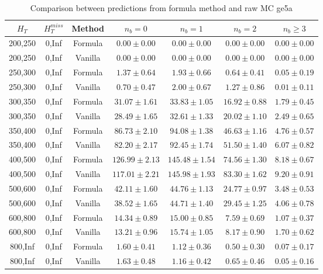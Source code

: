\begin{longtable}{ | c | c | c | c | c | c | c | }
\caption{Comparison between predictions from formula method and raw MC ge5a} \label{tab:formula-ge5a} \\    \hline 
$H_{T}$ & $H_{T}^{miss}$ & Method & $n_{b} = 0$ & $n_{b} = 1$ & $n_{b} = 2$ & $n_{b} \ge 3$ \\ \hline200,250 & 0,Inf & Formula  & $     0.00 \pm  0.00 $ & $     0.00 \pm  0.00 $ & $     0.00 \pm  0.00 $ & $     0.00 \pm  0.00 $  \\  
200,250 & 0,Inf & Vanilla  & $     0.00 \pm  0.00 $ & $     0.00 \pm  0.00 $ & $     0.00 \pm  0.00 $ & $     0.00 \pm  0.00 $  \\ \hline 
250,300 & 0,Inf & Formula  & $     1.37 \pm  0.64 $ & $     1.93 \pm  0.66 $ & $     0.64 \pm  0.41 $ & $     0.05 \pm  0.19 $  \\  
250,300 & 0,Inf & Vanilla  & $     0.70 \pm  0.47 $ & $     2.00 \pm  0.67 $ & $     1.27 \pm  0.86 $ & $     0.01 \pm  0.11 $  \\ \hline 
300,350 & 0,Inf & Formula  & $    31.07 \pm  1.61 $ & $    33.83 \pm  1.05 $ & $    16.92 \pm  0.88 $ & $     1.79 \pm  0.45 $  \\  
300,350 & 0,Inf & Vanilla  & $    28.49 \pm  1.65 $ & $    32.61 \pm  1.33 $ & $    20.02 \pm  1.10 $ & $     2.49 \pm  0.65 $  \\ \hline 
350,400 & 0,Inf & Formula  & $    86.73 \pm  2.10 $ & $    94.08 \pm  1.38 $ & $    46.63 \pm  1.16 $ & $     4.76 \pm  0.57 $  \\  
350,400 & 0,Inf & Vanilla  & $    82.20 \pm  2.17 $ & $    92.45 \pm  1.74 $ & $    51.50 \pm  1.40 $ & $     6.07 \pm  0.82 $  \\ \hline 
400,500 & 0,Inf & Formula  & $   126.99 \pm  2.13 $ & $   145.48 \pm  1.54 $ & $    74.56 \pm  1.30 $ & $     8.18 \pm  0.67 $  \\  
400,500 & 0,Inf & Vanilla  & $   117.01 \pm  2.21 $ & $   145.98 \pm  1.93 $ & $    83.30 \pm  1.62 $ & $     9.20 \pm  0.91 $  \\ \hline 
500,600 & 0,Inf & Formula  & $    42.11 \pm  1.60 $ & $    44.76 \pm  1.13 $ & $    24.77 \pm  0.97 $ & $     3.48 \pm  0.53 $  \\  
500,600 & 0,Inf & Vanilla  & $    38.52 \pm  1.65 $ & $    44.71 \pm  1.40 $ & $    29.45 \pm  1.25 $ & $     4.06 \pm  0.78 $  \\ \hline 
600,800 & 0,Inf & Formula  & $    14.34 \pm  0.89 $ & $    15.00 \pm  0.85 $ & $     7.59 \pm  0.69 $ & $     1.07 \pm  0.37 $  \\  
600,800 & 0,Inf & Vanilla  & $    13.21 \pm  0.96 $ & $    15.74 \pm  1.05 $ & $     8.17 \pm  0.90 $ & $     1.70 \pm  0.62 $  \\ \hline 
800,Inf & 0,Inf & Formula  & $     1.60 \pm  0.41 $ & $     1.12 \pm  0.36 $ & $     0.50 \pm  0.30 $ & $     0.07 \pm  0.17 $  \\  
800,Inf & 0,Inf & Vanilla  & $     1.63 \pm  0.48 $ & $     1.16 \pm  0.42 $ & $     0.65 \pm  0.46 $ & $     0.05 \pm  0.16 $  \\ \hline 
    \hline 
    \hline 
\end{longtable}